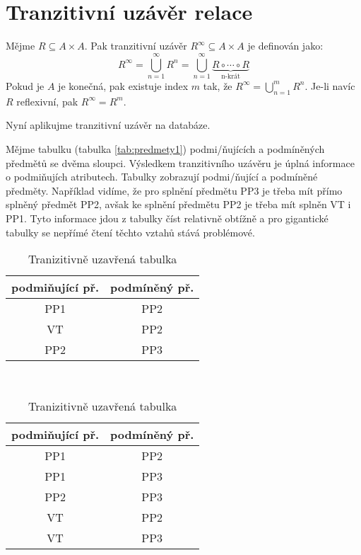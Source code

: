\section{Tranzitivní uzávěr relace}
\begin{uptheorem}
Mějme $R \subseteq A \times A$. Pak tranzitivní uzávěr $R^{\infty} \subseteq A \times A$ je definován jako:
$$
R^{\infty} = \bigcup_{n = 1}^{\infty} R^{n} = \bigcup_{n = 1}^{\infty} \underbrace{R \circ \cdots \circ R}_{\text{n-krát}}
$$
Pokud je $A$ je konečná, pak existuje index $m$ tak, že $R^{\infty} = \bigcup_{n = 1}^{m} R^{n}$. Je-li  navíc $R$ reflexivní, pak $R^{\infty} = R^{m}$.
\end{uptheorem}
Nyní aplikujme tranzitivní uzávěr na databáze.
\begin{upexample}
Mějme tabulku (tabulka \ref{tab:predmety1}) podmi\-/ňujících a podmíněných předmětů se dvěma sloupci. Výsledkem tranzitivního uzá\-věru je úplná informace o podmiňujích atributech. Tabulky zobrazují podmi\-/ňující a podmíněné předměty. Například vidíme, že pro splnění předmětu PP3 je třeba mít přímo splněný předmět PP2, avšak ke splnění předmětu PP2 je třeba mít splněn VT i PP1. Tyto informace jdou z tabulky číst relativně obtížně a pro gigantické tabulky se nepřímé čtení těchto vztahů stává problémové.
\begin{table}
\caption{Tranzitivní uzávěr tabulky}\label{tab:predmety}
\begin{subtable}[t]{0.45\textwidth}
\centering
\caption{Výchozí tabulka}\label{tab:predmety1}
\begin{tabular}{c | c}
podmiňující př. & podmíněný př. \\
\hline
\rowcolor{green}PP1 & PP2 \\
\rowcolor{red}VT & PP2 \\
\rowcolor{yellow}PP2 & PP3
\end{tabular}
\end{subtable}
~
\begin{subtable}[t]{0.45\textwidth}
\centering
\caption{Tranizitivně uzavřená tabulka}\label{tab:predmety2}
\begin{tabular}{c | c}
podmiňující př. & podmíněný př. \\
\hline
\rowcolor{green}PP1 & PP2 \\
\cellcolor{green}PP1 & \cellcolor{yellow}PP3 \\
\rowcolor{yellow}PP2 & PP3 \\
\rowcolor{red}VT & PP2 \\
\cellcolor{red}VT & \cellcolor{yellow}PP3
\end{tabular}
\end{subtable}
\end{table}
\end{upexample}
